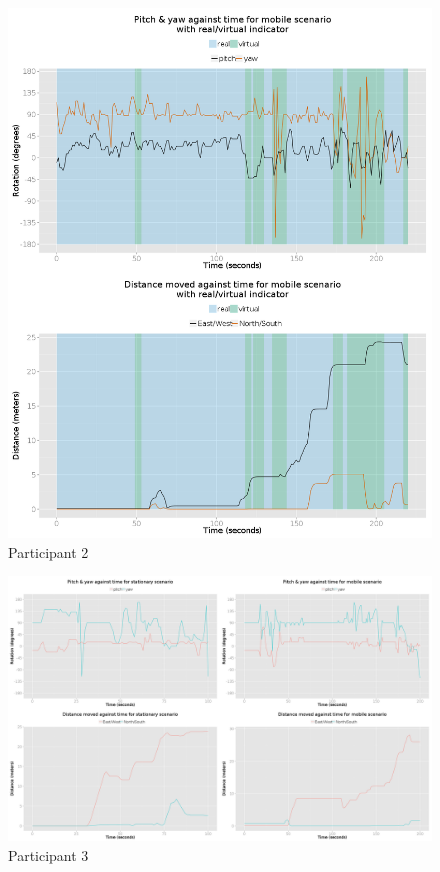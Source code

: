 \documentclass[oneside]{book}
\begin{document}
\begin{figure}[h]
	\begin{center}
		\includegraphics[width=\linewidth]{images/25072014_1300_2up.png}
		\caption{Participant 2}
		\label{participant_2_2up}
	\end{center}
\end{figure}


\begin{landscape}
	\begin{figure}[h]
		\begin{center}
			\includegraphics[width=\linewidth]{images/25072014_1400_4up.png}
			\caption{Participant 3}
			\label{participant_3_4up}
		\end{center}
	\end{figure}
\end{landscape}
\end{document}
